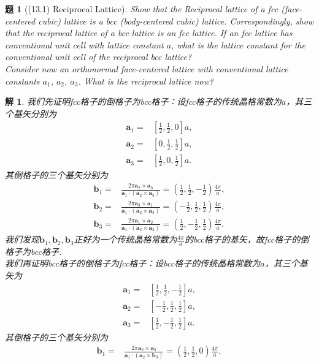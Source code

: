 \documentclass[UTF8,10pt,a4paper]{article}
\theoremstyle{Problem}
\newtheorem{prob}{题}
\theoremstyle{Solution}
\newtheorem*{sol}{解}
\begin{document}
\thispagestyle{FirstPageStyle}
\begin{prob}[(13.1) Reciprocal Lattice]
    Show that the Reciprocal lattice of a fcc (face-centered cubic) lattice is a bcc (body-centered cubic) lattice. Correspondingly, show that the reciprocal lattice of a bcc lattice is an fcc lattice. If an fcc lattice has conventional unit cell with lattice constant $a$, what is the lattice constant for the conventional unit cell of the reciprocal bcc lattice?\\
    Consider now an orthonormal face-centered lattice with conventional lattice constants $a_1$, $a_2$, $a_3$. What is the reciprocal lattice now?
\end{prob}
\begin{sol}
    我们先证明fcc格子的倒格子为bcc格子：设fcc格子的传统晶格常数为$a$，其三个基矢分别为
    \begin{align*}
        \bm{a}_1=&[\frac{1}{2},\frac{1}{2},0]a,\\
        \bm{a}_2=&[0,\frac{1}{2},\frac{1}{2}]a,\\
        \bm{a}_3=&[\frac{1}{2},0,\frac{1}{2}]a.
    \end{align*}
    其倒格子的三个基矢分别为
    \begin{align*}
        \bm{b}_1=&\frac{2\pi\bm{a}_2\times\bm{a}_3}{\bm{a}_1\cdot(\bm{a}_2\times\bm{a}_3)}=(\frac{1}{2},\frac{1}{2},-\frac{1}{2})\frac{4\pi}{a},\\
        \bm{b}_2=&\frac{2\pi\bm{a}_3\times\bm{a}_1}{\bm{a}_1\cdot(\bm{a}_2\times\bm{a}_3)}=(-\frac{1}{2},\frac{1}{2},\frac{1}{2})\frac{4\pi}{a},\\
        \bm{b}_3=&\frac{2\pi\bm{a}_1\times\bm{a}_2}{\bm{a}_1\cdot(\bm{a}_2\times\bm{a}_3)}=(\frac{1}{2},-\frac{1}{2},\frac{1}{2})\frac{4\pi}{a}.
    \end{align*}
    我们发现$\bm{b}_1,\bm{b}_2,\bm{b}_3$正好为一个传统晶格常数为$\frac{4\pi}{a}$的bcc格子的基矢，故fcc格子的倒格子为bcc格子.\\
    我们再证明bcc格子的倒格子为fcc格子：设bcc格子的传统晶格常数为$a$，其三个基矢为
    \begin{align*}
        \bm{a}_1=&[\frac{1}{2},\frac{1}{2},-\frac{1}{2}]a,\\
        \bm{a}_2=&[-\frac{1}{2},\frac{1}{2},\frac{1}{2}]a,\\
        \bm{a}_3=&[\frac{1}{2},-\frac{1}{2},\frac{1}{2}]a.
    \end{align*}
    其倒格子的三个基矢分别为
    \begin{align*}
        \bm{b}_1=&\frac{2\pi\bm{a}_2\times\bm{a}_3}{\bm{a}_1\cdot(\bm{a}_2\times\bm{b}_3)}=(\frac{1}{2},\frac{1}{2},0)\frac{4\pi}{a},\\

\end{align*}
\end{sol}
\end{document}
